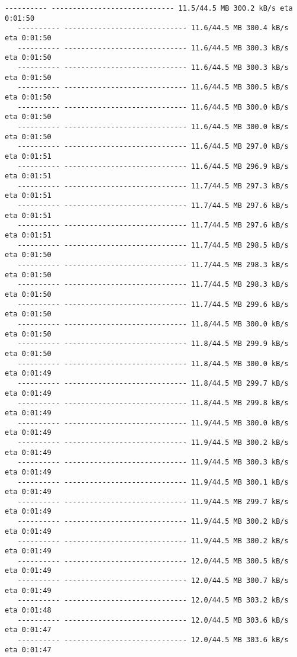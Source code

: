 \documentclass[11pt]{article}
\begin{document}
\begin{Verbatim}[commandchars=\\\{\}]
   ---------- ----------------------------- 11.5/44.5 MB 300.2 kB/s eta 0:01:50
   ---------- ----------------------------- 11.6/44.5 MB 300.4 kB/s eta 0:01:50
   ---------- ----------------------------- 11.6/44.5 MB 300.3 kB/s eta 0:01:50
   ---------- ----------------------------- 11.6/44.5 MB 300.3 kB/s eta 0:01:50
   ---------- ----------------------------- 11.6/44.5 MB 300.5 kB/s eta 0:01:50
   ---------- ----------------------------- 11.6/44.5 MB 300.0 kB/s eta 0:01:50
   ---------- ----------------------------- 11.6/44.5 MB 300.0 kB/s eta 0:01:50
   ---------- ----------------------------- 11.6/44.5 MB 297.0 kB/s eta 0:01:51
   ---------- ----------------------------- 11.6/44.5 MB 296.9 kB/s eta 0:01:51
   ---------- ----------------------------- 11.7/44.5 MB 297.3 kB/s eta 0:01:51
   ---------- ----------------------------- 11.7/44.5 MB 297.6 kB/s eta 0:01:51
   ---------- ----------------------------- 11.7/44.5 MB 297.6 kB/s eta 0:01:51
   ---------- ----------------------------- 11.7/44.5 MB 298.5 kB/s eta 0:01:50
   ---------- ----------------------------- 11.7/44.5 MB 298.3 kB/s eta 0:01:50
   ---------- ----------------------------- 11.7/44.5 MB 298.3 kB/s eta 0:01:50
   ---------- ----------------------------- 11.7/44.5 MB 299.6 kB/s eta 0:01:50
   ---------- ----------------------------- 11.8/44.5 MB 300.0 kB/s eta 0:01:50
   ---------- ----------------------------- 11.8/44.5 MB 299.9 kB/s eta 0:01:50
   ---------- ----------------------------- 11.8/44.5 MB 300.0 kB/s eta 0:01:49
   ---------- ----------------------------- 11.8/44.5 MB 299.7 kB/s eta 0:01:49
   ---------- ----------------------------- 11.8/44.5 MB 299.8 kB/s eta 0:01:49
   ---------- ----------------------------- 11.9/44.5 MB 300.0 kB/s eta 0:01:49
   ---------- ----------------------------- 11.9/44.5 MB 300.2 kB/s eta 0:01:49
   ---------- ----------------------------- 11.9/44.5 MB 300.3 kB/s eta 0:01:49
   ---------- ----------------------------- 11.9/44.5 MB 300.1 kB/s eta 0:01:49
   ---------- ----------------------------- 11.9/44.5 MB 299.7 kB/s eta 0:01:49
   ---------- ----------------------------- 11.9/44.5 MB 300.2 kB/s eta 0:01:49
   ---------- ----------------------------- 11.9/44.5 MB 300.2 kB/s eta 0:01:49
   ---------- ----------------------------- 12.0/44.5 MB 300.5 kB/s eta 0:01:49
   ---------- ----------------------------- 12.0/44.5 MB 300.7 kB/s eta 0:01:49
   ---------- ----------------------------- 12.0/44.5 MB 303.2 kB/s eta 0:01:48
   ---------- ----------------------------- 12.0/44.5 MB 303.6 kB/s eta 0:01:47
   ---------- ----------------------------- 12.0/44.5 MB 303.6 kB/s eta 0:01:47

\end{Verbatim}
\end{document}
